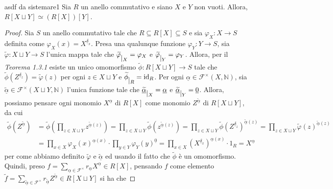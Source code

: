 \begin{teo}[]{asdf da sistemare1}
  Sia $R$ un anello commutativo e siano $X$ e $Y$ non vuoti. Allora, $R[X\sqcup Y]\simeq (R[X])[Y]$.
\end{teo}
\vspace{-4mm}
\begin{proof}
  Sia $S$ un anello commutativo tale che $R\subseteq R[X]\subseteq S$ e sia $\varphi_X\colon X\to S$ definita come $\varphi_X(x)=X^{\underline{\delta}_x}$. 
  Presa una qualunque funzione $\varphi_Y\colon Y\to S$, sia $\widetilde{\varphi}\colon X\sqcup Y\to S$ l'unica mappa tale che 
  $\widetilde{\varphi} \raisebox{-.5em}{$\vert_{X}$}=\varphi_X$ e $\widetilde{\varphi} \raisebox{-.5em}{$\vert_{Y}$}=\varphi_Y$. 
  Allora, per il \emph{Teorema 1.3.1} esiste un unico omomorfismo $\widetilde{\phi}\colon R[X\sqcup Y]\to S$ tale che 
  $\widetilde{\phi}(Z^{\underline{\delta}_z})=\widetilde{\varphi}(z)$ per ogni $z\in X\sqcup Y$ e 
  $\widetilde{\phi} \raisebox{-.5em}{$\vert_{R}$}= \operatorname{id}_R$. 
  Per ogni $\underline{\alpha}\in \mathcal{F}^{\times}(X,\mathbb{N})$, 
  sia $\underline{\widetilde{\alpha}}\in \mathcal{F}^{\times}(X \sqcup Y,\mathbb{N})$ 
  l'unica funzione tale che $\underline{\widetilde{\alpha}} \raisebox{-.5em}{$\vert_{X}$} = \underline{\alpha}$ e 
  $\underline{\widetilde{\alpha}} \raisebox{-.5em}{$\vert_{Y}$} = \underline{0}$. 
  Allora, possiamo pensare ogni monomio $X^{\underline{\alpha}}$ di $R[X]$ come monomio $Z^{\widetilde{\underline{\alpha}}}$ di $R[X\sqcup Y]$, da cui 
  {\setlength{\belowdisplayskip}{2.5pt} \setlength{\abovedisplayskip}{5pt}
  \begin{align*} 
    \widetilde{\phi}(Z^{\widetilde{\underline{\alpha}}}) &= \widetilde{\phi}\left( \prod\limits_{z\in X\sqcup Y} z^{\widetilde{\underline{\alpha}}(z)} \right) 
    = \prod\limits_{z\in X\sqcup Y} \widetilde{\phi}\left(z^{\widetilde{\underline{\alpha}}(z)}\right) 
    = \prod\limits_{z\in X\sqcup Y} \widetilde{\phi}\left(Z^{\underline{\delta}_z}\right)^{\widetilde{\underline{\alpha}}(z)} 
    = \prod\limits_{z\in X\sqcup Y} \widetilde{\varphi}(z)^{\widetilde{\underline{\alpha}}(z)} \\ 
    &= \prod\limits_{x\in X} \varphi_X(x)^{\underline{\alpha}(x)}\cdot \prod\limits_{y\in Y} \varphi_Y(y)^{\underline{0}} 
    = \prod\limits_{x\in X} (X^{\underline{\delta}_x})^{\underline{\alpha}(x)}\cdot 1_R = X^{\underline{\alpha}} 
  \end{align*}}
  \noindent per come abbiamo definito $\widetilde{\varphi}$ e $\underline{\widetilde{\alpha}}$ ed usando il fatto che $\widetilde{\phi}$ è un omomorfismo. 
  Quindi, preso $f=\sum\limits_{\underline{\alpha}\in \mathcal{F}^{\times}} r_{\underline{\alpha}} X^{\underline{\alpha}}\in R[X]$, 
  pensando $f$ come elemento $\widetilde{f}=\sum\limits_{\widetilde{\underline{\alpha}}\in \mathcal{F}^{\times}} r_{\widetilde{\underline{\alpha}}} 
  Z^{\widetilde{\underline{\alpha}}}\in R[X\sqcup Y]$ si ha che 
  

\end{proof}
